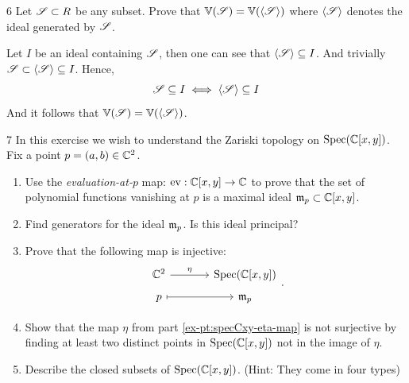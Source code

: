 \documentclass[Notebook.tex]{subfiles}
\begin{document}
\vspace{.2in}

\begin{problem}{6}
     Let $\operatorname{\mathscr S} \subset R$ be any subset. Prove that $\mathbb V(\operatorname{\mathscr S}) = \mathbb V(\langle \operatorname{\mathscr S} \rangle)$ where $\langle \operatorname{\mathscr S} \rangle$ denotes the ideal generated by $\operatorname{\mathscr S}$. 
\end{problem}

\begin{solution}
    \bbni 

    Let $I$ be an ideal containing $\operatorname{\mathscr S}$, then one can see that $\langle \operatorname{\mathscr S} \rangle \subseteq I$. And trivially $\operatorname{\mathscr S} \subset \langle \operatorname{\mathscr S} \rangle \subseteq I$. Hence, 
    \[\operatorname{\mathscr S} \subseteq I \iff \langle \operatorname{\mathscr S} \rangle \subseteq I\] 
    And it follows that $\mathbb V(\operatorname{\mathscr S}) = \mathbb V(\langle \operatorname{\mathscr S} \rangle)$. 
\end{solution}

\newpage 

\begin{problem}{7}
    In this exercise we wish to understand the Zariski topology on $\operatorname{Spec}(\mathbb C[x,y])$. Fix a point $p=(a,b) \in \mathbb C^{2}$.
    \begin{enumerate}[label=(\alph*),ref=\theenumi\alph*]
        \item Use the \emph{evaluation-at-$p$} map: $\operatorname{ev}: \mathbb C[x,y] \to \mathbb C$ to prove that the set of polynomial functions vanishing at $p$ is a maximal ideal $\operatorname{\mathfrak{m}}_{p} \subset \mathbb C[x,y]$. 
        \item Find generators for the ideal $\operatorname{\mathfrak{m}}_{p}$. Is this ideal principal?
        \item\label{ex-pt:specCxy-eta-map} Prove that the following map is injective:
        \[
        \begin{tikzcd}[row sep = .5em, column sep = 3.5em]
        \C^{2} \arrow[r,"\eta"] & \Spec(\C[x,y]) \\
        p \arrow[r,mapsto] & \fm_{p}
        \end{tikzcd}.
        \]
        \item Show that the map $\eta$ from part \ref{ex-pt:specCxy-eta-map} is not surjective by finding at least two distinct points in $\operatorname{Spec}(\mathbb C[x,y])$ not in the image of $\eta$. 
        \item Describe the closed subsets of $\operatorname{Spec}(\mathbb C[x,y])$. (Hint: They come in four types)
    \end{enumerate}
\end{problem}
\end{document}
